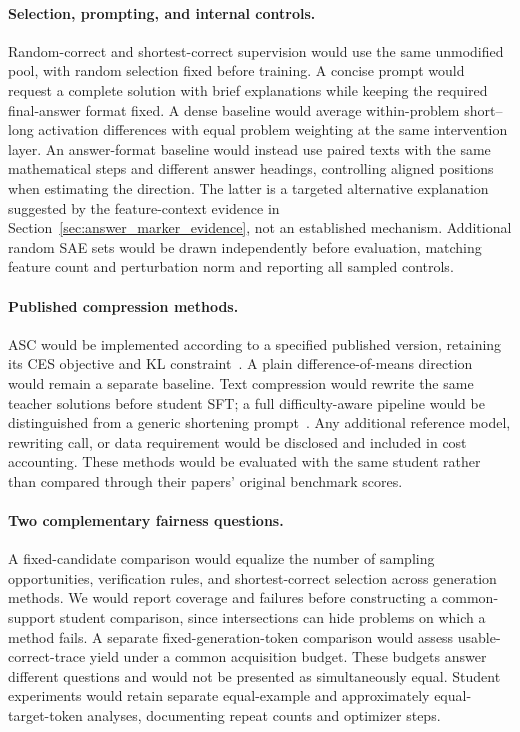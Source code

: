 \paragraph{Selection, prompting, and internal controls.}
Random-correct and shortest-correct supervision would use the same unmodified pool, with random selection fixed before training.
A concise prompt would request a complete solution with brief explanations while keeping the required final-answer format fixed.
A dense baseline would average within-problem short--long activation differences with equal problem weighting at the same intervention layer.
An answer-format baseline would instead use paired texts with the same mathematical steps and different answer headings, controlling aligned positions when estimating the direction.
The latter is a targeted alternative explanation suggested by the feature-context evidence in Section~\ref{sec:answer_marker_evidence}, not an established mechanism.
Additional random SAE sets would be drawn independently before evaluation, matching feature count and perturbation norm and reporting all sampled controls.

\paragraph{Published compression methods.}
ASC would be implemented according to a specified published version, retaining its CES objective and KL constraint~\citep{azizi2026activation}.
A plain difference-of-means direction would remain a separate baseline.
Text compression would rewrite the same teacher solutions before student SFT; a full difficulty-aware pipeline would be distinguished from a generic shortening prompt~\citep{wu2025concise}.
Any additional reference model, rewriting call, or data requirement would be disclosed and included in cost accounting.
These methods would be evaluated with the same student rather than compared through their papers' original benchmark scores.

\paragraph{Two complementary fairness questions.}
A fixed-candidate comparison would equalize the number of sampling opportunities, verification rules, and shortest-correct selection across generation methods.
We would report coverage and failures before constructing a common-support student comparison, since intersections can hide problems on which a method fails.
A separate fixed-generation-token comparison would assess usable-correct-trace yield under a common acquisition budget.
These budgets answer different questions and would not be presented as simultaneously equal.
Student experiments would retain separate equal-example and approximately equal-target-token analyses, documenting repeat counts and optimizer steps.

